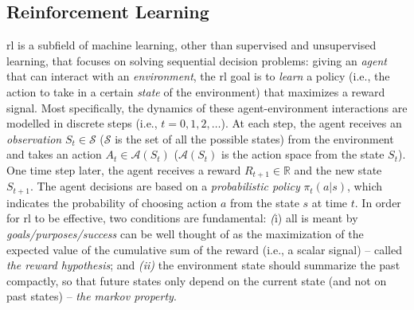 \subsection{Reinforcement Learning}
\ac{rl} is a subfield of machine learning, other than supervised and unsupervised learning,
 that focuses on solving sequential decision problems: 
 giving an \emph{agent} that can interact with an \emph{environment}, the \ac{rl} goal is to \emph{learn} a policy (i.e., the action to take in a certain \emph{state} of the environment) that maximizes a reward signal.
 Most specifically, the dynamics of these agent-environment interactions are modelled in discrete steps (i.e., $t=0,1,2,\dots$). 
 At each step, the agent receives an \emph{observation} $S_t \in \mathcal{S}$ ($\mathcal{S}$ is the
 set of all the possible states) from the environment and takes an action $A_t \in \mathcal{A}(S_t)$ 
 ($\mathcal{A}(S_t)$ is the action space from the state $S_t$).
 One time step later, the agent receives a reward $R_{t+1} \in \mathbb{R}$ and the new state $S_{t+1}$.
 The agent decisions are based on a \emph{probabilistic policy} $\pi_t(a | s)$, which indicates 
 the probability of choosing action $a$ from the state $s$ at time $t$.
In order for \ac{rl} to be effective, two conditions are fundamental: \emph(i) all is meant by \emph{goals/purposes/success} can be well thought of as the maximization of the expected 
    value of the cumulative sum of the reward (i.e., a scalar signal) -- called \emph{the reward hypothesis}; and \emph{(ii)} the environment state should summarize the past compactly, so that future states only depend on the current state (and not on past states) -- 
    \emph{the markov property}.

